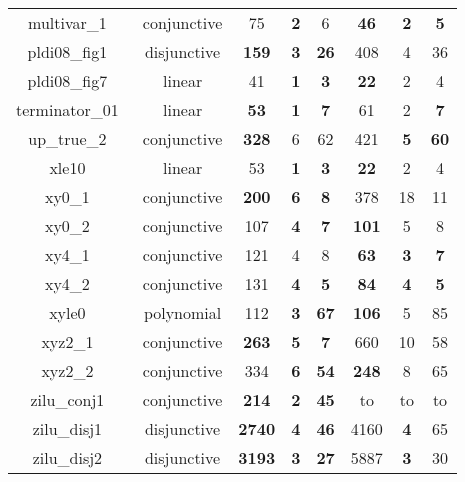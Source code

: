 \begin{table}[t]
\begin{tabular}{l c | c c c | c c c |}
\multicolumn{1}{|c|}{multivar\_1~\cite{jeannet2010interproc}}	&conjunctive	&75	&\textbf{2}	&6	&\textbf{46}	&\textbf{2}	&\textbf{5}\\
\multicolumn{1}{|c|}{pldi08\_fig1~\cite{gulavani2008automatically}}&disjunctive	&\textbf{159} & \textbf{3} & \textbf{26}   &408 &4 & 36				\\
\multicolumn{1}{|c|}{pldi08\_fig7~\cite{gulavani2008automatically}}	&linear		&41	&\textbf{1}	&\textbf{3}	&\textbf{22}	&2	&4\\
\multicolumn{1}{|c|}{terminator\_01~\cite{Dirk:SVCOMP:2016}}	&linear 			&\textbf{53}	&\textbf{1}	&\textbf{7}	&61	&2	&\textbf{7}\\
\multicolumn{1}{|c|}{up\_true\_2~\cite{isil2013inductive}}		&conjunctive	&\textbf{328}	&6	&62					   &421	&\textbf{5}	&\textbf{60}		\\
\multicolumn{1}{|c|}{xle10~\cite{sharma2012interpolants}}		&linear 		&53	&\textbf{1}	&\textbf{3}	&\textbf{22}	&2	&4\\
\multicolumn{1}{|c|}{xy0\_1~\cite{sharma2012interpolants}}		&conjunctive	&\textbf{200}	&\textbf{6}	&\textbf{8}	&378	&18	&11\\
\multicolumn{1}{|c|}{xy0\_2~\cite{sharma2012interpolants}}		&conjunctive	&107	&\textbf{4}	&\textbf{7}	&\textbf{101}	&5	&8\\
\multicolumn{1}{|c|}{xy4\_1~\cite{sharma2012interpolants}}		&conjunctive	&121	&4   &8 &\textbf{63}	&\textbf{3}	&\textbf{7}\\
\multicolumn{1}{|c|}{xy4\_2~\cite{sharma2012interpolants}}		&conjunctive	&131	&\textbf{4}	&\textbf{5}	&\textbf{84}	&\textbf{4}	&\textbf{5}\\
\multicolumn{1}{|c|}{xyle0~\cite{sharma2012interpolants}}		&polynomial 	&112 &\textbf{3}	&\textbf{67}   &\textbf{106}	&5	&85						\\
\multicolumn{1}{|c|}{xyz2\_1~\cite{sharma2012interpolants}}		&conjunctive	&\textbf{263}	&\textbf{5}	&\textbf{7}	&660	&10	&58\\
\multicolumn{1}{|c|}{xyz2\_2~\cite{sharma2012interpolants}}		&conjunctive	&334	&\textbf{6}	&\textbf{54}		 &\textbf{248} &8 &65	\\
\multicolumn{1}{|c|}{zilu\_conj1~\cite{zilu:repo}}				&conjunctive	&\textbf{214}	&\textbf{2}	&\textbf{45}	         &to	&to	&to			\\
\multicolumn{1}{|c|}{zilu\_disj1~\cite{zilu:repo}}				&disjunctive	&\xmark \textbf{2740} & \textbf{4} &\textbf{46}        &4160 	& \textbf{4} &{65} 	\\
\multicolumn{1}{|c|}{zilu\_disj2~\cite{zilu:repo}}				&disjunctive	&\xmark \textbf{3193} & \textbf{3} & \textbf{27}	     &5887 & \textbf{3} & 30  	\\

\end{tabular}
\end{table}
